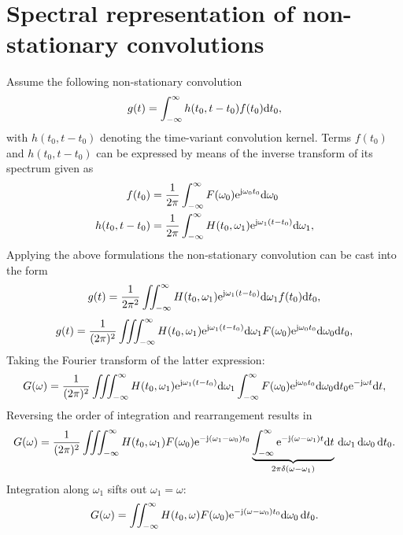 \section{Spectral representation of non-stationary convolutions}
\label{Sec:Non_stat_conv}

Assume the following non-stationary convolution
\begin{equation}
g(t) = \int_{-\infty}^{\infty} h(t_0,t-t_0) f(t_0) \mathrm{d} t_0,
\label{Eq:App:Non_stat_conv_td}
\end{equation}
with $h(t_0,t-t_0)$ denoting the time-variant convolution kernel.
Terms $f(t_0)$ and $h(t_0,t-t_0)$ can be expressed by means of the inverse transform of its spectrum given as
\begin{align}
f(t_0) &= \frac{1}{2\pi} \int_{-\infty}^{\infty} F(\omega_0) \mathrm{e}^{\mathrm{j} \omega_0 t_0}\mathrm{d} \omega_0
\\
h(t_0,t-t_0) &= \frac{1}{2\pi}\int_{-\infty}^{\infty} H(t_0,\omega_1) \mathrm{e}^{\mathrm{j} \omega_1(t-t_0)} \mathrm{d} \omega_1,
\end{align}
Applying the above formulations the non-stationary convolution can be cast into the form
\begin{equation}
g(t) = \frac{1}{2\pi^2} \iint_{-\infty}^{\infty}  H(t_0,\omega_1) \mathrm{e}^{\mathrm{j} \omega_1(t-t_0)} \mathrm{d} \omega_1 f(t_0) \mathrm{d} t_0,
\end{equation}
\begin{equation}
g(t) = \frac{1}{(2\pi)^2} \iiint_{-\infty}^{\infty}  H(t_0,\omega_1) \mathrm{e}^{\mathrm{j} \omega_1(t-t_0)} \mathrm{d} \omega_1  F(\omega_0) \mathrm{e}^{\mathrm{j} \omega_0 t_0}\mathrm{d} \omega_0 \mathrm{d} t_0,
\end{equation}
Taking the Fourier transform of the latter expression:
\begin{equation}
G(\omega) =\frac{1}{(2\pi)^2} \iiint_{-\infty}^{\infty} H(t_0,\omega_1) \mathrm{e}^{\mathrm{j} \omega_1(t-t_0)} \mathrm{d} \omega_1 \int_{-\infty}^{\infty} F(\omega_0) \mathrm{e}^{\mathrm{j} \omega_0 t_0}\mathrm{d} \omega_0 \mathrm{d} t_0 \mathrm{e}^{-\mathrm{j} \omega t} \mathrm{d} t,
\end{equation}
Reversing the order of integration and rearrangement results in
\begin{equation}
G(\omega) =\frac{1}{(2\pi)^2} \iiint_{-\infty}^{\infty} H(t_0,\omega_1) F(\omega_0)  \mathrm{e}^{-\mathrm{j} (\omega_1-\omega_0) t_0}  
\underbrace{ \int_{-\infty}^{\infty}  \mathrm{e}^{-\mathrm{j} (\omega-\omega_1) t}  \mathrm{d} t}_{2\pi \delta(\omega-\omega_1)}
 \, \mathrm{d} \omega_1 \,  \mathrm{d} \omega_0 \, \mathrm{d} t_0.
\end{equation}
Integration along $\omega_1$ sifts out $\omega_1 = \omega$:
\begin{equation}
G(\omega) =  \iint_{-\infty}^{\infty} H(t_0,\omega) F(\omega_0)  \mathrm{e}^{-\mathrm{j} (\omega-\omega_0) t_0}   \mathrm{d} \omega_0 \, \mathrm{d} t_0.
\end{equation}
